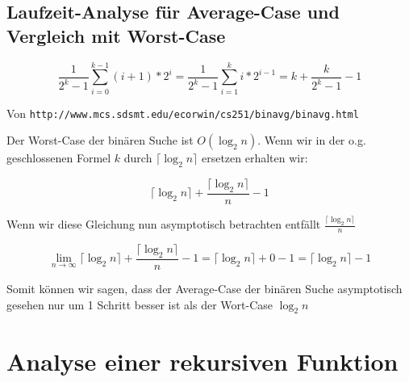 \documentclass{article}
\begin{document}
\subsection{Laufzeit-Analyse für Average-Case und Vergleich mit Worst-Case}

\vspace{1em}

$$\frac{1}{2^k - 1}\sum_{i=0}^{k - 1} (i + 1) * 2^i = \frac{1}{2^k - 1}\sum_{i=1}^k i * 2^{i - 1} = k + \frac{k}{2^k - 1} - 1$$

\begin{center}
	Von \texttt{http://www.mcs.sdsmt.edu/ecorwin/cs251/binavg/binavg.html}
\end{center}

\vspace{1em}

\begin{flushleft}
	Der Worst-Case der binären Suche ist $O(\log_2 n)$. Wenn wir in der o.g. geschlossenen Formel $k$
	durch $\lceil\log_2 n\rceil$ ersetzen erhalten wir:
\end{flushleft}

\vspace{0em}

$$\lceil\log_2 n\rceil + \frac{\lceil\log_2 n\rceil}{n} - 1$$

\vspace{0em}

\begin{flushleft}
	Wenn wir diese Gleichung nun asymptotisch betrachten entfällt $\frac{\lceil\log_2 n\rceil}{n}$
\end{flushleft}

\vspace{0em}

$$\lim_{n\to\infty} \lceil\log_2 n\rceil + \frac{\lceil\log_2 n\rceil}{n} - 1 = \lceil\log_2 n\rceil + 0 - 1 = \lceil\log_2 n\rceil - 1$$

\vspace{0em}

\begin{flushleft}
	Somit können wir sagen, dass der Average-Case der binären Suche asymptotisch gesehen nur um 1 Schritt
	besser ist als der Wort-Case $\log_2n$
\end{flushleft}

\section{Analyse einer rekursiven Funktion}
\end{document}
